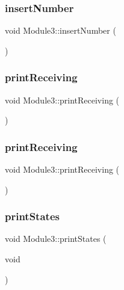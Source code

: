 \subsubsection{\texorpdfstring{insert\+Number}{insertNumber}\hspace{0.1cm}{\footnotesize\ttfamily [2/2]}}
{\footnotesize\ttfamily void Module3\+::insert\+Number (\begin{DoxyParamCaption}{ }\end{DoxyParamCaption})\hspace{0.3cm}{\ttfamily [signal]}}

\mbox{\label{class_module3_ab15973c4f5ceb61037de263982e3989a}} 
\subsubsection{\texorpdfstring{print\+Receiving}{printReceiving}\hspace{0.1cm}{\footnotesize\ttfamily [1/2]}}
{\footnotesize\ttfamily void Module3\+::print\+Receiving (\begin{DoxyParamCaption}{ }\end{DoxyParamCaption})\hspace{0.3cm}{\ttfamily [signal]}}

\mbox{\label{class_module3_ab15973c4f5ceb61037de263982e3989a}} 
\subsubsection{\texorpdfstring{print\+Receiving}{printReceiving}\hspace{0.1cm}{\footnotesize\ttfamily [2/2]}}
{\footnotesize\ttfamily void Module3\+::print\+Receiving (\begin{DoxyParamCaption}{ }\end{DoxyParamCaption})\hspace{0.3cm}{\ttfamily [signal]}}

\mbox{\label{class_module3_ac91b756cb9b50b0d7e2e177823baad48}} 
\subsubsection{\texorpdfstring{print\+States}{printStates}\hspace{0.1cm}{\footnotesize\ttfamily [1/2]}}
{\footnotesize\ttfamily void Module3\+::print\+States (\begin{DoxyParamCaption}\item[{void}]{ }\end{DoxyParamCaption})\hspace{0.3cm}{\ttfamily [slot]}}

